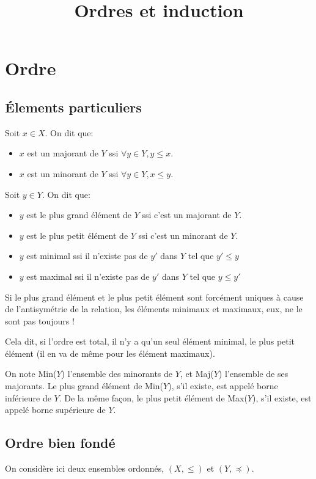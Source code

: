 \documentclass{scrartcl}
\title{Ordres et induction}
\author{}
\date{}
\begin{document}
	\maketitle
	\section{Ordre}
		\subsection{Élements particuliers}
			Soit $x\in X$. On dit que:
			\begin{itemize}
				\item $x$ est un majorant de $Y$ ssi $\forall y \in Y, y\leq x$.
				\item $x$ est un minorant de $Y$ ssi $\forall y \in Y, x \leq y$.
			\end{itemize}
			Soit $y\in Y$. On dit que:
			\begin{itemize}
				\item $y$ est le plus grand élément de $Y$ ssi c'est un majorant de $Y$.
				\item $y$ est le plus petit élément de $Y$ ssi c'est un minorant de $Y$.
				\item $y$ est minimal ssi il n'existe pas de $y'$ dans $Y$ tel que $y'\leq y$
				\item $y$ est maximal ssi il n'existe pas de $y'$ dans $Y$ tel que $y\leq y'$
			\end{itemize}
			
			\rem Si le plus grand élément et le plus petit élément sont forcément uniques
			à cause de l'antisymétrie de la relation, les éléments minimaux et maximaux, eux, ne le sont
			pas toujours !

			\rem Cela dit, si l'ordre est total, il n'y a qu'un seul élément minimal, le plus
			petit élément (il en va de même pour les élément maximaux).

			On note Min($Y$) l'ensemble des minorants de $Y$, et Maj($Y$) l'ensemble de ses majorants.
			Le plus grand élément de Min($Y$), s'il existe, est appelé borne inférieure de $Y$. De la même façon,
			le plus petit élément de Max($Y$), s'il existe, est appelé borne supérieure de $Y$. 

		\subsection{Ordre bien fondé}
			On considère ici deux ensembles ordonnés, $(X,\leq)$ et $(Y,\preceq)$.
\end{document}
